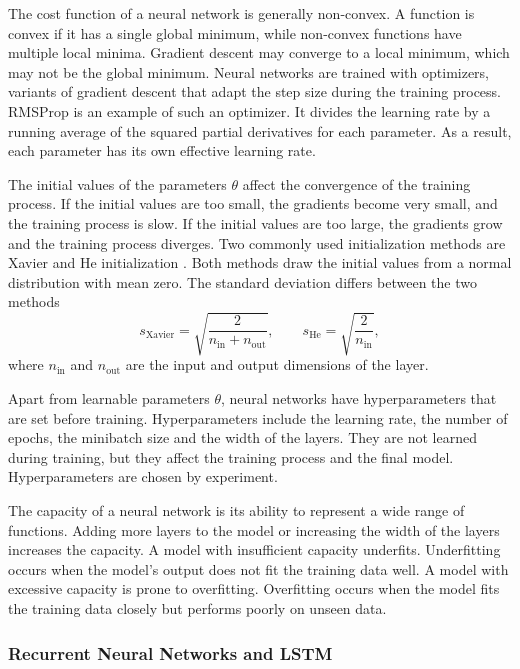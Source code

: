 The cost function of a neural network is generally non-convex. A function is convex if it has a single global minimum, while non-convex functions have multiple local minima. Gradient descent may converge to a local minimum, which may not be the global minimum. Neural networks are trained with optimizers, variants of gradient descent that adapt the step size during the training process. RMSProp is an example of such an optimizer. It divides the learning rate by a running average of the squared partial derivatives for each parameter. As a result, each parameter has its own effective learning rate. 

The initial values of the parameters $\theta$ affect the convergence of the training process. If the initial values are too small, the gradients become very small, and the training process is slow. If the initial values are too large, the gradients grow and the training process diverges. Two commonly used initialization methods are Xavier \parencite{xavier-init} and He initialization \parencite{heDelvingDeepRectifiers2015}. Both methods draw the initial values from a normal distribution with mean zero. The standard deviation differs between the two methods
\begin{equation}
s_{\text{Xavier}} = \sqrt{\frac{2}{n_{\text{in}} + n_{\text{out}}}}, \qquad
s_{\text{He}} = \sqrt{\frac{2}{n_{\text{in}}}},
\end{equation}
where $n_{\text{in}}$ and $n_{\text{out}}$ are the input and output dimensions of the layer.

Apart from learnable parameters $\theta$, neural networks have hyperparameters that are set before training. Hyperparameters include the learning rate, the number of epochs, the minibatch size and the width of the layers. They are not learned during training, but they affect the training process and the final model. Hyperparameters are chosen by experiment. 

The capacity of a neural network is its ability to represent a wide range of functions. Adding more layers to the model or increasing the width of the layers increases the capacity. A model with insufficient capacity underfits. Underfitting occurs when the model's output does not fit the training data well. A model with excessive capacity is prone to overfitting. Overfitting occurs when the model fits the training data closely but performs poorly on unseen data.

\subsubsection{Recurrent Neural Networks and LSTM}\label{sec:rnn}

